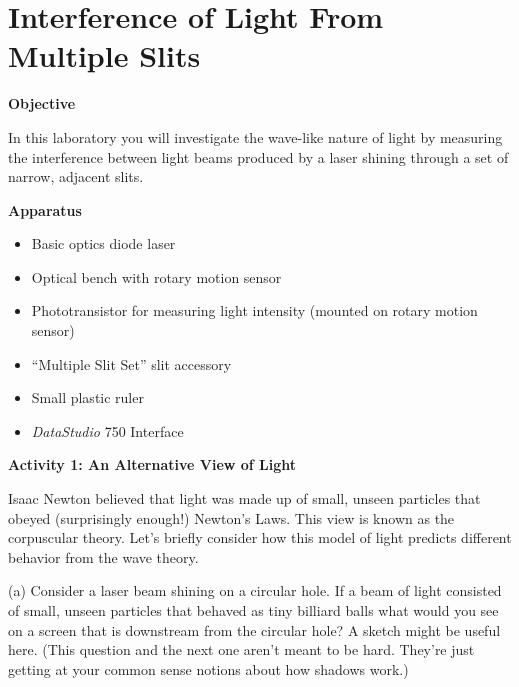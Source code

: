 
\section{Interference of Light From Multiple Slits}
\label{interference_lab}
\makelabheader %

\textbf{Objective}

In this laboratory you will investigate the wave-like nature of light by measuring the interference 
between light beams produced by a laser shining through a set of narrow, adjacent
slits. 

\textbf{Apparatus}

\begin{itemize}
\item Basic optics diode laser
\item Optical bench with rotary motion sensor
\item Phototransistor for measuring light intensity (mounted on rotary motion sensor)
\item ``Multiple Slit Set'' slit accessory
\item Small plastic ruler
\item {\it DataStudio} 750 Interface
\end{itemize}


\textbf{Activity 1: An Alternative View of Light}

Isaac Newton believed that light was made up of small, unseen particles
that obeyed (surprisingly enough!) Newton's Laws. This view is known
as the corpuscular theory. Let's briefly consider how this model of light
predicts different behavior from the wave theory.

(a) Consider a laser beam shining on a circular hole. If a beam of
light consisted of small, unseen particles that behaved as tiny billiard
balls what would you see on a screen that is downstream from the circular
hole? A sketch might be useful here.  (This question and the next one aren't meant to be hard.
They're just getting at your common sense notions about how shadows work.)
\answerspace{35mm}

